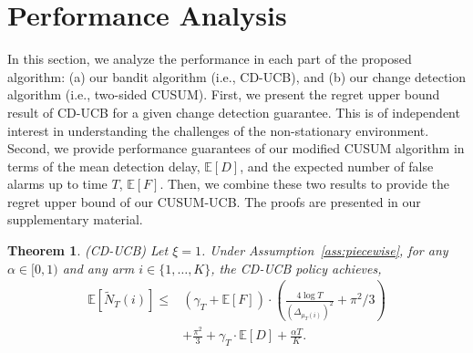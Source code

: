 \documentclass[letterpaper]{article} %
\newtheorem{theorem}{Theorem}
\newcommand{\blue}{}
\begin{document}
\section{Performance Analysis}\label{sec:analysis}

{In this section, we analyze the performance in each part of the proposed
algorithm: (a) our bandit algorithm (i.e., CD-UCB), and (b) our change
detection algorithm (i.e., two-sided CUSUM).  First, we present the
regret upper bound result of CD-UCB for a given change detection
guarantee.
This is of independent interest in understanding the
challenges of the non-stationary environment.  Second, we provide
performance guarantees of our modified CUSUM algorithm in terms of the
mean detection delay, $\mathbb{E}[D]$, and the expected number of false alarms up to time $T$, $\mathbb{E}[F]$. Then, we combine
these two results to provide the regret upper bound of our CUSUM-UCB.}
{\blue The proofs are presented in our supplementary material.}


\begin{theorem}\label{thm:CD-UCB}
\emph{(CD-UCB)} Let $\xi=1$. Under Assumption~\ref{ass:piecewise}, for any $\alpha\in[0,1)$ and any arm $i\in\{1,\ldots,K\}$, the CD-UCB policy achieves,
\begin{eqnarray}\label{thm1}
\mathbb{E}[\tilde{N}_T(i)]\leq
&\left(\gamma_T+\mathbb{E}[F]\right)\cdot\left(\frac{4\log T}{(\Delta_{\mu_T(i)})^2}+\pi^2/3\right) \\\nonumber
&+\frac{\pi^2}{3}
+\gamma_T\cdot \mathbb{E}[D]+\frac{\alpha T}{K}.
\end{eqnarray}
\end{theorem}
\end{document}
